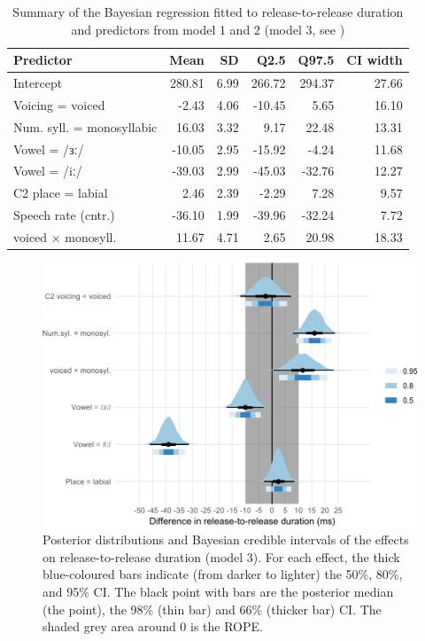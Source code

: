 \documentclass[
  12pt,
  a4paper,
  authoryear, 5p]{elsarticle}
\begin{document}
\begin{table}[t]

\caption{\label{tab:rr-3-table}Summary of the Bayesian regression fitted to release-to-release duration and predictors from model 1 and 2 (model 3, see )}
\centering
\fontsize{8}{10}\selectfont
\begin{tabular}{lrrrrr}
\toprule
Predictor & Mean & SD & Q2.5 & Q97.5 & CI width\\
\midrule
Intercept & 280.81 & 6.99 & 266.72 & 294.37 & 27.66\\
Voicing = voiced & -2.43 & 4.06 & -10.45 & 5.65 & 16.10\\
Num. syll. = monosyllabic & 16.03 & 3.32 & 9.17 & 22.48 & 13.31\\
Vowel = /ɜː/ & -10.05 & 2.95 & -15.92 & -4.24 & 11.68\\
Vowel = /iː/ & -39.03 & 2.99 & -45.03 & -32.76 & 12.27\\
C2 place = labial & 2.46 & 2.39 & -2.29 & 7.28 & 9.57\\
Speech rate (cntr.) & -36.10 & 1.99 & -39.96 & -32.24 & 7.72\\
voiced × monosyll. & 11.67 & 4.71 & 2.65 & 20.98 & 18.33\\
\bottomrule
\end{tabular}
\end{table}

\begin{figure}
\includegraphics[width=\linewidth]{2019-english-rr_files/figure-latex/rr-3-intervals-1} \caption{Posterior distributions and Bayesian credible intervals of the effects on release-to-release duration (model 3). For each effect, the thick blue-coloured bars indicate (from darker to lighter) the 50\%, 80\%, and 95\% CI. The black point with bars are the posterior median (the point), the 98\% (thin bar) and 66\% (thicker bar) CI. The shaded grey area around 0 is the ROPE.}\label{f:rr-3-intervals}
\end{figure}
\end{document}
